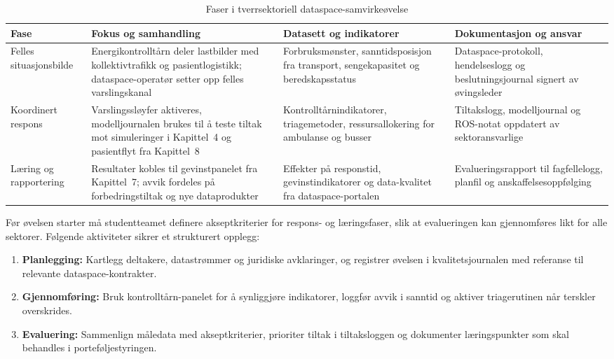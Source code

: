 \begin{table}[ht]
    \centering
    \caption{Faser i tverrsektoriell dataspace-samvirkeøvelse}
    \label{tab:samvirkeovelse}
    \begin{tabular}{|p{2.9cm}|p{4.4cm}|p{4.6cm}|p{3.2cm}|}
        \hline
        \textbf{Fase} & \textbf{Fokus og samhandling} & \textbf{Datasett og indikatorer} & \textbf{Dokumentasjon og ansvar} \\
        \hline
        Felles situasjonsbilde & Energikontrolltårn deler lastbilder med kollektivtrafikk og pasientlogistikk; dataspace-operatør setter opp felles varslingskanal & Forbruksmønster, sanntidsposisjon fra transport, sengekapasitet og beredskapsstatus & Dataspace-protokoll, hendelseslogg og beslutningsjournal signert av øvingsleder \\
        \hline
        Koordinert respons & Varslingssløyfer aktiveres, modelljournalen brukes til å teste tiltak mot simuleringer i Kapittel~4 og pasientflyt fra Kapittel~8 & Kontrolltårnindikatorer, triagemetoder, ressursallokering for ambulanse og busser & Tiltakslogg, modelljournal og ROS-notat oppdatert av sektoransvarlige \\
        \hline
        Læring og rapportering & Resultater kobles til gevinstpanelet fra Kapittel~7; avvik fordeles på forbedringstiltak og nye dataprodukter & Effekter på responstid, gevinstindikatorer og data-kvalitet fra dataspace-portalen & Evalueringsrapport til fagfellelogg, planfil og anskaffelsesoppfølging \\
        \hline
    \end{tabular}
\end{table}

Før øvelsen starter må studentteamet definere akseptkriterier for respons- og læringsfaser, slik at evalueringen kan gjennomføres likt for alle sektorer. Følgende aktiviteter sikrer et strukturert opplegg:
\begin{enumerate}
    \item \textbf{Planlegging:} Kartlegg deltakere, datastrømmer og juridiske avklaringer, og registrer øvelsen i kvalitetsjournalen med referanse til relevante dataspace-kontrakter.\citep{dsb2024nser}
    \item \textbf{Gjennomføring:} Bruk kontrolltårn-panelet for å synliggjøre indikatorer, loggfør avvik i sanntid og aktiver triagerutinen når terskler overskrides.\citep{energinorge2023beredskap,helsedir2023beredskap}
    \item \textbf{Evaluering:} Sammenlign måledata med akseptkriterier, prioriter tiltak i tiltaksloggen og dokumenter læringspunkter som skal behandles i porteføljestyringen.\citep{digdir2024samstyring}
\end{enumerate}

